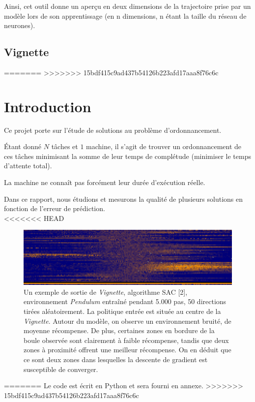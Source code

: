 \documentclass[12pt]{article}
\begin{document}
Ainsi, cet outil donne un aperçu en deux dimensions de la trajectoire prise par un modèle lors de son apprentissage (en n dimensions, n étant la taille du réseau de neurones). \\

\newpage
\subsection{Vignette} \label{vign}
=======
\setlength{\parindent}{2ex}
>>>>>>> 15bdf415c9ad437b54126b223afd17aaa8f76c6c

\section{Introduction}
Ce projet porte sur l'étude de solutions au problème d'ordonnancement. \par

Étant donné $N$ tâches et $1$ machine, il s'agit de trouver un ordonnancement de ces tâches minimisant la somme de leur temps de complétude (minimiser le temps d'attente total). \par

La machine ne connaît pas forcément leur durée d'exécution réelle. \par

Dans ce rapport, nous étudions et mesurons la qualité de plusieurs solutions en fonction de l'erreur de prédiction. \\

<<<<<<< HEAD
\begin{figure}[htp]
    \centering
    \includegraphics[width=15cm]{Images/Vignette_pendulum}
    \caption{Un exemple de sortie de \emph{Vignette}, algorithme SAC  [2], environnement \emph{Pendulum} entraîné pendant 5.000 pas, 50 directions tirées aléatoirement. La politique entrée est située au centre de la \emph{Vignette}. Autour du modèle, on observe un environnement bruité, de moyenne récompense. De plus, certaines zones en bordure de la boule observée sont clairement à faible récompense, tandis que deux zones à proximité offrent une meilleur récompense. On en déduit que ce sont deux zones dans lesquelles la descente de gradient est susceptible de converger.}
    \label{fig:vignettePendulum}
\end{figure}
=======
Le code est écrit en Python et sera fourni en annexe.
>>>>>>> 15bdf415c9ad437b54126b223afd17aaa8f76c6c
\end{document}
